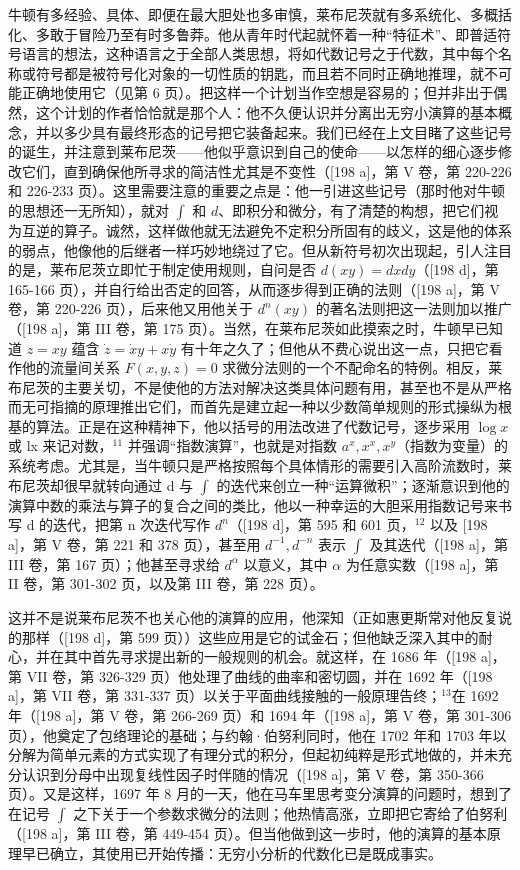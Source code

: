 牛顿有多经验、具体、即便在最大胆处也多审慎，莱布尼茨就有多系统化、多概括化、多敢于冒险乃至有时多鲁莽。他从青年时代起就怀着一种“特征术”、即普适符号语言的想法，这种语言之于全部人类思想，将如代数记号之于代数，其中每个名称或符号都是被符号化对象的一切性质的钥匙，而且若不同时正确地推理，就不可能正确地使用它（见第 6 页）。把这样一个计划当作空想是容易的；但并非出于偶然，这个计划的作者恰恰就是那个人：他不久便认识并分离出无穷小演算的基本概念，并以多少具有最终形态的记号把它装备起来。我们已经在上文目睹了这些记号的诞生，并注意到莱布尼茨——他似乎意识到自己的使命——以怎样的细心逐步修改它们，直到确保他所寻求的简洁性尤其是不变性（{[}198 a{]}，第 V 卷，第 220-226 和 226-233 页）。这里需要注意的重要之点是：他一引进这些记号（那时他对牛顿的思想还一无所知），就对 \(\int\) 和 \(d\)、即积分和微分，有了清楚的构想，把它们视为互逆的算子。诚然，这样做他就无法避免不定积分所固有的歧义，这是他的体系的弱点，他像他的后继者一样巧妙地绕过了它。但从新符号初次出现起，引人注目的是，莱布尼茨立即忙于制定使用规则，自问是否 \(d(xy) = dxdy\)（{[}198 d{]}，第 165-166 页），并自行给出否定的回答，从而逐步得到正确的法则（{[}198 a{]}，第 V 卷，第 220-226 页），后来他又用他关于 \(d^n(xy)\) 的著名法则把这一法则加以推广（{[}198 a{]}，第 III 卷，第 175 页）。当然，在莱布尼茨如此摸索之时，牛顿早已知道 \(z = xy\) 蕴含 \(\dot{z} = \dot{x}y + x\dot{y}\) 有十年之久了；但他从不费心说出这一点，只把它看作他的流量间关系 \(F(x,y,z) = 0\) 求微分法则的一个不配命名的特例。相反，莱布尼茨的主要关切，不是使他的方法对解决这类具体问题有用，甚至也不是从严格而无可指摘的原理推出它们，而首先是建立起一种以少数简单规则的形式操纵为根基的算法。正是在这种精神下，他以括号的用法改进了代数记号，逐步采用 \(\log x\) 或 lx 来记对数，\(^{11}\) 并强调“指数演算”，也就是对指数 \(a^{x}, x^{x}, x^{y}\)（指数为变量）的系统考虑。尤其是，当牛顿只是严格按照每个具体情形的需要引入高阶流数时，莱布尼茨却很早就转向通过 d 与 \(\int\) 的迭代来创立一种“运算微积”；逐渐意识到他的演算中数的乘法与算子的复合之间的类比，他以一种幸运的大胆采用指数记号来书写 d 的迭代，把第 n 次迭代写作 \(d^{n}\)（{[}198 d{]}，第 595 和 601 页，\(^{12}\) 以及 {[}198 a{]}，第 V 卷，第 221 和 378 页），甚至用 \(d^{-1}, d^{-n}\) 表示 \(\int\) 及其迭代（{[}198 a{]}，第 III 卷，第 167 页）；他甚至寻求给 \(d^{\alpha}\) 以意义，其中 \(\alpha\) 为任意实数（{[}198 a{]}，第 II 卷，第 301-302 页，以及第 III 卷，第 228 页）。

这并不是说莱布尼茨不也关心他的演算的应用，他深知（正如惠更斯常对他反复说的那样（{[}198 d{]}，第 599 页））这些应用是它的试金石；但他缺乏深入其中的耐心，并在其中首先寻求提出新的一般规则的机会。就这样，在 1686 年（{[}198 a{]}，第 VII 卷，第 326-329 页）他处理了曲线的曲率和密切圆，并在 1692 年（{[}198 a{]}，第 VII 卷，第 331-337 页）以关于平面曲线接触的一般原理告终；\(^{13}\)在 1692 年（{[}198 a{]}，第 V 卷，第 266-269 页）和 1694 年（{[}198 a{]}，第 V 卷，第 301-306 页），他奠定了包络理论的基础；与约翰·伯努利同时，他在 1702 年和 1703 年以分解为简单元素的方式实现了有理分式的积分，但起初纯粹是形式地做的，并未充分认识到分母中出现复线性因子时伴随的情况（{[}198 a{]}，第 V 卷，第 350-366 页）。又是这样，1697 年 8 月的一天，他在马车里思考变分演算的问题时，想到了在记号 \(\int\) 之下关于一个参数求微分的法则；他热情高涨，立即把它寄给了伯努利（{[}198 a{]}，第 III 卷，第 449-454 页）。但当他做到这一步时，他的演算的基本原理早已确立，其使用已开始传播：无穷小分析的代数化已是既成事实。

